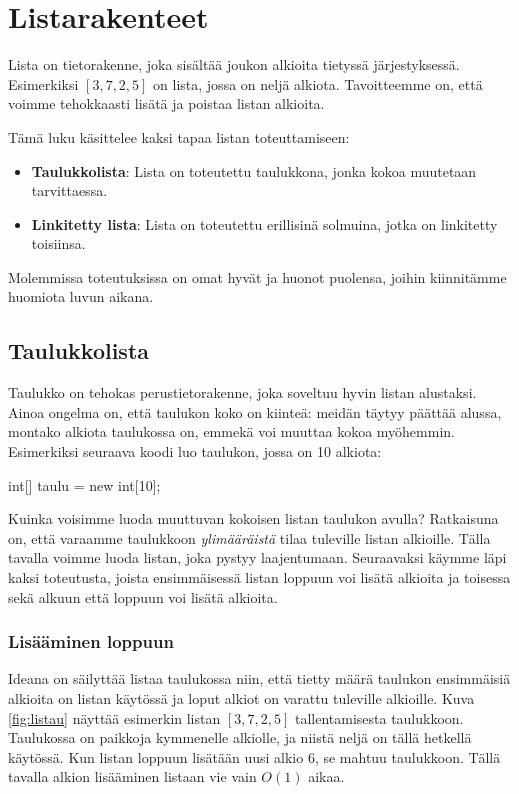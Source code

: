 \chapter{Listarakenteet}

Lista on tietorakenne, joka sisältää joukon alkioita tietyssä järjestyksessä.
Esimerkiksi $[3,7,2,5]$ on lista, jossa on neljä alkiota.
Tavoitteemme on, että voimme tehokkaasti lisätä ja poistaa listan alkioita.

Tämä luku käsittelee kaksi tapaa listan toteuttamiseen:

\begin{itemize}
\item \textbf{Taulukkolista}: Lista on toteutettu taulukkona,
jonka kokoa muutetaan tarvittaessa.
\item \textbf{Linkitetty lista}: Lista on toteutettu erillisinä solmuina,
jotka on linkitetty toisiinsa.
\end{itemize}

Molemmissa toteutuksissa on omat hyvät ja huonot puolensa,
joihin kiinnitämme huomiota luvun aikana.

\section{Taulukkolista}

Taulukko on tehokas perustietorakenne, joka soveltuu hyvin listan alustaksi.
Ainoa ongelma on, että taulukon koko on kiinteä: meidän täytyy päättää alussa,
montako alkiota taulukossa on, emmekä voi muuttaa kokoa myöhemmin.
Esimerkiksi seuraava koodi luo taulukon, jossa on 10 alkiota:

\begin{code}
int[] taulu = new int[10];
\end{code}

Kuinka voisimme luoda muuttuvan kokoisen listan taulukon avulla?
Ratkaisuna on, että varaamme taulukkoon \emph{ylimääräistä}
tilaa tuleville listan alkioille.
Tälla tavalla voimme luoda listan, joka pystyy laajentumaan.
Seuraavaksi käymme läpi kaksi toteutusta,
joista ensimmäisessä listan loppuun voi lisätä alkioita
ja toisessa sekä alkuun että loppuun voi lisätä alkioita.

\subsection{Lisääminen loppuun}

Ideana on säilyttää listaa taulukossa niin,
että tietty määrä taulukon ensimmäisiä alkioita on listan käytössä
ja loput alkiot on varattu tuleville alkioille.
Kuva \ref{fig:listau} näyttää esimerkin listan $[3,7,2,5]$ tallentamisesta taulukkoon.
Taulukossa on paikkoja kymmenelle alkiolle, ja niistä neljä on tällä hetkellä käytössä.
Kun listan loppuun lisätään uusi alkio 6, se mahtuu taulukkoon.
Tällä tavalla alkion lisääminen listaan vie vain $O(1)$ aikaa.

